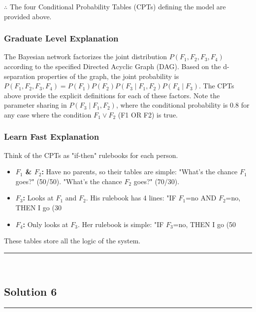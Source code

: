 \documentclass{article}
\begin{document}
\subsubsection*{\normalfont}{$\therefore$ The four Conditional Probability Tables (CPTs) defining the model are provided above.}

\subsubsection*{Graduate Level Explanation}
The Bayesian network factorizes the joint distribution $P(F_1, F_2, F_3, F_4)$ according to the specified Directed Acyclic Graph (DAG). Based on the d-separation properties of the graph, the joint probability is $P(F_1, F_2, F_3, F_4) = P(F_1)P(F_2)P(F_3 \mid F_1, F_2)P(F_4 \mid F_3)$. The CPTs above provide the explicit definitions for each of these factors. Note the parameter sharing in $P(F_3 \mid F_1, F_2)$, where the conditional probability is $0.8$ for any case where the condition $F_1 \lor F_2$ (F1 OR F2) is true.

\subsubsection*{Learn Fast Explanation}
Think of the CPTs as "if-then" rulebooks for each person.
\begin{itemize}
    \item \textbf{$F_1$ \& $F_2$:} Have no parents, so their tables are simple: "What's the chance $F_1$ goes?" (50/50). "What's the chance $F_2$ goes?" (70/30).
    \item \textbf{$F_3$:} Looks at $F_1$ and $F_2$. His rulebook has 4 lines: "IF $F_1$=no AND $F_2$=no, THEN I go (30%
    \item \textbf{$F_4$:} Only looks at $F_3$. Her rulebook is simple: "IF $F_3$=no, THEN I go (50%
\end{itemize}
These tables store all the logic of the system.

\noindent\rule{\textwidth}{0.4pt}\\

\newpage

\subsection*{Solution 6}
\noindent\rule{\textwidth}{0.4pt}\\
\end{document}
